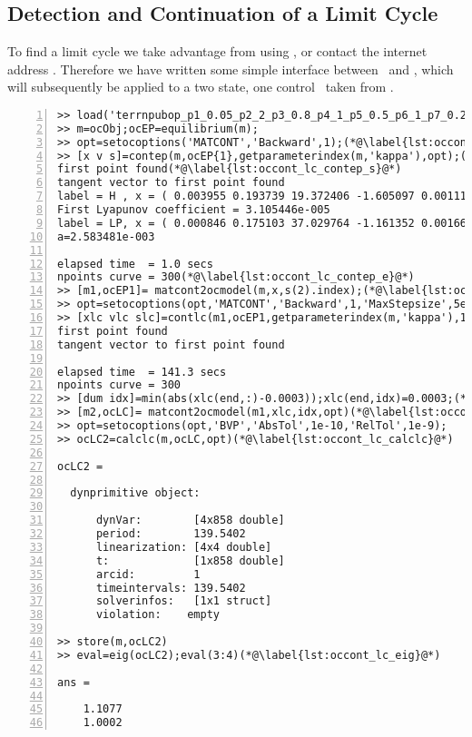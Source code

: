 \subsection{Detection and Continuation of a Limit Cycle}
To find a limit cycle we take advantage from using \MATCONT, \citet[see]{dhoogeetal2003} or contact the internet address \httpMATCONT. Therefore we have written some simple interface between \OCT\ and \MATCONT, which will subsequently be applied to a two state, one control \OCPRO\ taken from \citet{caulkinsetalinsub2007}.
\begin{lstlisting}[numbers=left]
>> load('terrnpubop_p1_0.05_p2_2_p3_0.8_p4_1_p5_0.5_p6_1_p7_0.25_p8_4_p9_0.05_p10_0.0003_p11_0_p12_0.05_p13_1_p14_1e-005_p15_Inf.mat')
>> m=ocObj;ocEP=equilibrium(m);
>> opt=setocoptions('MATCONT','Backward',1);(*@\label{lst:occont_lc_matcont}@*)
>> [x v s]=contep(m,ocEP{1},getparameterindex(m,'kappa'),opt);(*@\label{lst:occont_lc_contep}@*)
first point found(*@\label{lst:occont_lc_contep_s}@*)
tangent vector to first point found
label = H , x = ( 0.003955 0.193739 19.372406 -1.605097 0.001115 )
First Lyapunov coefficient = 3.105446e-005
label = LP, x = ( 0.000846 0.175103 37.029764 -1.161352 0.001660 )
a=2.583481e-003

elapsed time  = 1.0 secs
npoints curve = 300(*@\label{lst:occont_lc_contep_e}@*)
>> [m1,ocEP1]= matcont2ocmodel(m,x,s(2).index);(*@\label{lst:occont_lc_matcont2ocmodel}@*)
>> opt=setocoptions(opt,'MATCONT','Backward',1,'MaxStepsize',5e-1);
>> [xlc vlc slc]=contlc(m1,ocEP1,getparameterindex(m,'kappa'),1e-6,20,4,opt);(*@\label{lst:occont_lc_contlc}@*)
first point found
tangent vector to first point found

elapsed time  = 141.3 secs
npoints curve = 300
>> [dum idx]=min(abs(xlc(end,:)-0.0003));xlc(end,idx)=0.0003;(*@\label{lst:occont_lc_minabs}@*)
>> [m2,ocLC]= matcont2ocmodel(m1,xlc,idx,opt)(*@\label{lst:occont_lc_matcont2ocmodellc}@*)
>> opt=setocoptions(opt,'BVP','AbsTol',1e-10,'RelTol',1e-9);
>> ocLC2=calclc(m,ocLC,opt)(*@\label{lst:occont_lc_calclc}@*)
 
ocLC2 =
 
  dynprimitive object:
 
      dynVar:        [4x858 double]
      period:        139.5402
      linearization: [4x4 double]
      t:             [1x858 double]
      arcid:         1
      timeintervals: 139.5402
      solverinfos:   [1x1 struct]
      violation:    empty

>> store(m,ocLC2)
>> eval=eig(ocLC2);eval(3:4)(*@\label{lst:occont_lc_eig}@*)

ans =

    1.1077
    1.0002
\end{lstlisting}

